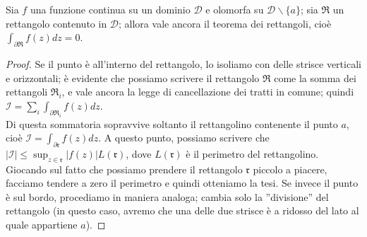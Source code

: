 \begin{teorema}
Sia $f$ una funzione continua su un dominio $\mathcal{D}$ e olomorfa su $\mathcal{D} \backslash \{a\}$; sia $\mathfrak{R}$ un rettangolo contenuto in $\mathcal{D}$; allora vale ancora il teorema dei rettangoli, cioè $\int_{\partial \mathfrak{R}} f(z)dz=0$.
\end{teorema}
\begin{proof}
Se il punto è all'interno del rettangolo, lo isoliamo con delle strisce verticali e orizzontali; è evidente che possiamo scrivere il rettangolo $\mathfrak{R}$ come la somma dei rettangoli $\mathfrak{R}_i$, e vale ancora la legge di cancellazione dei tratti in comune; quindi $\mathcal{I}=\sum_i \int_{\partial \mathfrak{R}_i} f(z)dz$. \\ Di questa sommatoria sopravvive soltanto il rettangolino contenente il punto $a$, cioè $\mathcal{I}=\int_{\partial \mathfrak{r}} f(z)dz$. A questo punto, possiamo scrivere che $|\mathcal{I}| \leq \sup_{z \in \mathfrak{r}} |f(z)| L(\mathfrak{r})$, dove $L(\mathfrak{r})$ è il perimetro del rettangolino. \\ Giocando sul fatto che possiamo prendere il rettangolo $\mathfrak{r}$ piccolo a piacere, facciamo tendere a zero il perimetro e quindi otteniamo la tesi. Se invece il punto è sul bordo, procediamo in maniera analoga; cambia solo la ''divisione'' del rettangolo (in questo caso, avremo che una delle due strisce è a ridosso del lato al quale appartiene $a$).
\end{proof}

